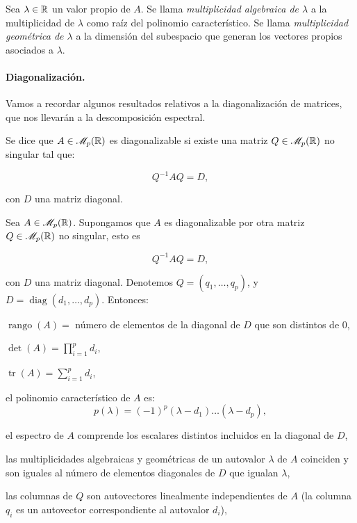 \begin{ndef}
  Sea $\lambda \in \mathbb{R}$ un valor propio de $A$. Se llama \emph{multiplicidad algebraica de $\lambda$} a la multiplicidad
  de $\lambda$ como raíz del polinomio característico. Se llama \emph{multiplicidad geométrica de $\lambda$} a la dimensión
  del subespacio que generan los vectores propios asociados a $\lambda$.
\end{ndef}

\paragraph{Diagonalización.}\hfill

Vamos a recordar algunos resultados relativos a la diagonalización de matrices, que nos llevarán a la descomposición espectral.

    \begin{ndef}
      Se dice que $A\in \mathscr{M}_{p}(\mathbb{R})$ es diagonalizable si existe una matriz $Q\in \mathscr{M}_{p}(\mathbb{R})$ no singular tal que:
      
      \[
      Q^{-1}AQ = D,
      \]
      
      con $D$ una matriz diagonal.
    \end{ndef}

    \begin{nth}
      Sea $A\in \mathscr{M}_{p}(\mathbb{R})$. Supongamos que $A$ es diagonalizable por otra matriz $Q\in \mathscr{M}_{p}(\mathbb{R})$ no singular, esto es
      
      \[
      Q^{-1}AQ = D,
      \]
      
      con $D$ una matriz diagonal. Denotemos $Q = (q_1,\dots,q_p)$, y $D= \operatorname{diag}(d_1,\dots,d_p)$. Entonces:
      
      \begin{nlist}
      \item $\operatorname{rango}(A) = $ número de elementos de la diagonal de $D$ que son distintos de 0,
      \item $\det(A) = \prod_{i = 1}^p d_i$,
      \item $\operatorname{tr}(A) = \sum_{i = 1}^p d_i$,
      \item el polinomio característico de $A$ es:
        \[
        p(\lambda) = (-1)^p (\lambda-d_1)\dots(\lambda-d_p),
        \]
      \item el espectro de $A$ comprende los escalares distintos incluidos en la diagonal de $D$,
      \item las multiplicidades algebraicas y geométricas de un autovalor $\lambda$ de $A$ coinciden y son iguales al número de elementos diagonales de $D$ que igualan $\lambda$,
      \item las columnas de $Q$ son autovectores linealmente independientes de $A$ (la columna $q_i$ es un autovector correspondiente al autovalor $d_i$),
    \end{nlist}
\end{nth}

